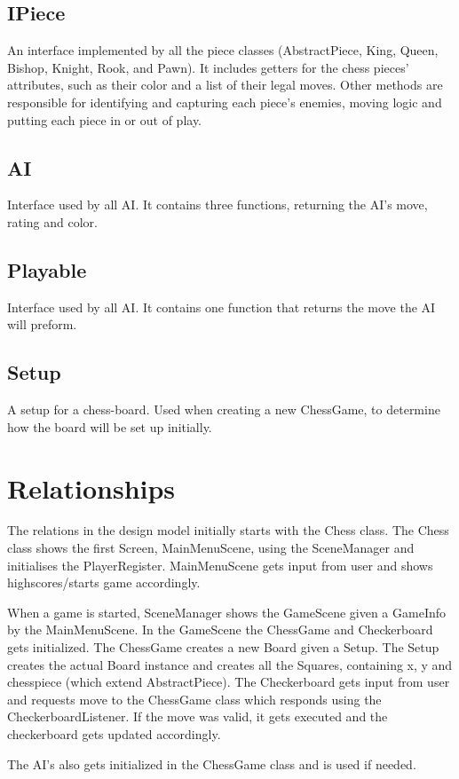 \documentclass{article}
\begin{document}
\subsection {IPiece}
An interface implemented by all the piece classes (AbstractPiece, King, Queen, Bishop, Knight, Rook, and Pawn). It includes getters for the chess pieces’ attributes, such as their color and a list of their legal moves. Other methods are responsible for identifying and capturing each piece’s enemies, moving logic and putting each piece in or out of play.

\subsection {AI}
Interface used by all AI. It contains three functions, returning  the AI’s move, rating and color.

\subsection {Playable}
Interface used by all AI. It  contains one function that returns the move the AI will preform.

\subsection {Setup}
A setup for a chess-board. Used when creating a new ChessGame, to determine how the board will be set up initially.

\section*{Relationships}
The relations in the design model initially starts with the Chess class. The Chess class shows the first Screen, MainMenuScene, using the SceneManager and initialises the PlayerRegister. MainMenuScene gets input from user and shows highscores/starts game accordingly.

When a game is started, SceneManager shows the GameScene given a GameInfo by the MainMenuScene. In the GameScene the ChessGame and Checkerboard gets initialized. The ChessGame creates a new Board given a Setup. The Setup creates the actual Board instance and creates all the Squares, containing x, y and chesspiece (which extend AbstractPiece). The Checkerboard gets input from user and requests move to the ChessGame class which responds using the CheckerboardListener. If the move was valid, it gets executed and the checkerboard gets updated accordingly.

The AI’s also gets initialized in the ChessGame class and is used if needed.
\end{document}

